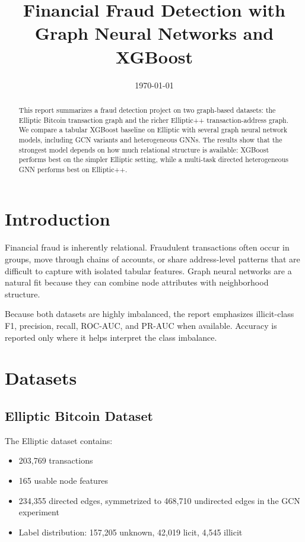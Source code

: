 \documentclass[11pt,a4paper]{article}
\title{\textbf{Financial Fraud Detection with Graph Neural Networks and XGBoost}}
\author{}
\date{\today}
\begin{document}
\maketitle

\begin{abstract}
This report summarizes a fraud detection project on two graph-based datasets: the Elliptic Bitcoin transaction graph and the richer Elliptic++ transaction-address graph. We compare a tabular XGBoost baseline on Elliptic with several graph neural network models, including GCN variants and heterogeneous GNNs. The results show that the strongest model depends on how much relational structure is available: XGBoost performs best on the simpler Elliptic setting, while a multi-task directed heterogeneous GNN performs best on Elliptic++.
\end{abstract}

\section{Introduction}
Financial fraud is inherently relational. Fraudulent transactions often occur in groups, move through chains of accounts, or share address-level patterns that are difficult to capture with isolated tabular features. Graph neural networks are a natural fit because they can combine node attributes with neighborhood structure.

Because both datasets are highly imbalanced, the report emphasizes illicit-class F1, precision, recall, ROC-AUC, and PR-AUC when available. Accuracy is reported only where it helps interpret the class imbalance.

\section{Datasets}

\subsection{Elliptic Bitcoin Dataset}
The Elliptic dataset contains:
\begin{itemize}[noitemsep]
    \item 203,769 transactions
    \item 165 usable node features
    \item 234,355 directed edges, symmetrized to 468,710 undirected edges in the GCN experiment
    \item Label distribution: 157,205 unknown, 42,019 licit, 4,545 illicit
\end{itemize}
\end{document}
